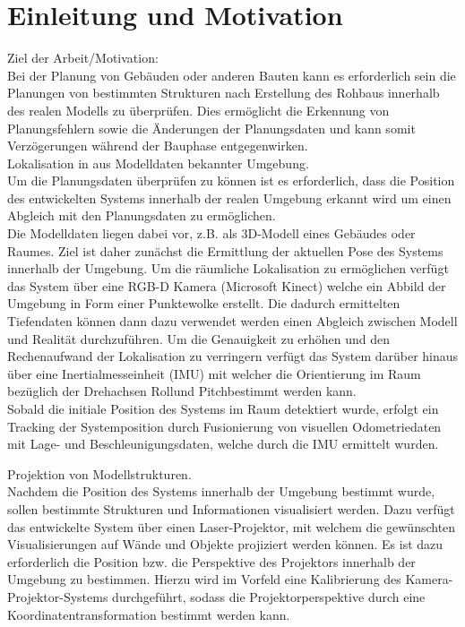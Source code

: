 \chapter{Einleitung und Motivation}

Ziel der Arbeit/Motivation:\\
Bei der Planung von Gebäuden oder anderen Bauten kann es erforderlich sein die Planungen von bestimmten Strukturen nach Erstellung des Rohbaus innerhalb des realen Modells zu überprüfen. Dies ermöglicht die Erkennung von Planungsfehlern sowie die Änderungen der Planungsdaten und kann somit Verzögerungen während der Bauphase entgegenwirken.\\

Lokalisation in aus Modelldaten bekannter Umgebung.\\
Um die Planungsdaten überprüfen zu können ist es erforderlich, dass die Position des entwickelten Systems innerhalb der realen Umgebung erkannt wird um einen Abgleich mit den Planungsdaten zu ermöglichen.\\
Die Modelldaten liegen dabei vor, z.B. als 3D-Modell eines Gebäudes oder Raumes. Ziel ist daher zunächst die Ermittlung der aktuellen Pose des Systems innerhalb der Umgebung. Um die räumliche Lokalisation zu ermöglichen verfügt das System über eine RGB-D Kamera (Microsoft Kinect) welche ein Abbild der Umgebung in Form einer Punktewolke erstellt. Die dadurch ermittelten Tiefendaten können dann dazu verwendet werden einen Abgleich zwischen Modell und Realität durchzuführen. Um die Genauigkeit zu erhöhen und den Rechenaufwand der Lokalisation zu verringern verfügt das System darüber hinaus über eine Inertialmesseinheit (IMU) mit welcher die Orientierung im Raum bezüglich der Drehachsen \glqq Roll\grqq\space und \glqq Pitch\grqq\space bestimmt werden kann.\\
Sobald die initiale Position des Systems im Raum detektiert wurde, erfolgt ein Tracking der Systemposition durch Fusionierung von visuellen Odometriedaten mit Lage- und Beschleunigungsdaten, welche durch die IMU ermittelt wurden.

Projektion von Modellstrukturen.\\
Nachdem die Position des Systems innerhalb der Umgebung bestimmt wurde, sollen bestimmte Strukturen und Informationen visualisiert werden. Dazu verfügt das entwickelte System über einen Laser-Projektor, mit welchem die gewünschten Visualisierungen auf Wände und Objekte projiziert werden können. Es ist dazu erforderlich die Position bzw. die Perspektive des Projektors innerhalb der Umgebung zu bestimmen. Hierzu wird im Vorfeld eine Kalibrierung des Kamera-Projektor-Systems durchgeführt, sodass die Projektorperspektive durch eine Koordinatentransformation bestimmt werden kann.

